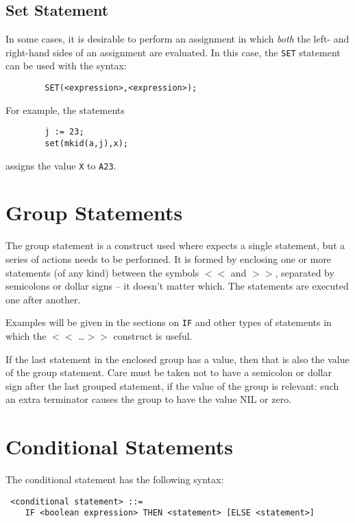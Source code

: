 \subsection{Set Statement}

In some cases, it is desirable to perform an assignment in which {\em both\/}
the left- and right-hand sides of an assignment are
evaluated.  In this case, the {\tt SET} statement can be used
with the syntax:

\begin{verbatim}
        SET(<expression>,<expression>);
\end{verbatim}
For example, the statements
\begin{verbatim}
        j := 23;
        set(mkid(a,j),x);
\end{verbatim}
assigns the value {\tt X} to {\tt A23}.

\section{Group Statements}

The group statement is a construct used where
{\REDUCE} expects a single statement, but a series of actions needs to be
performed.  It is formed by enclosing one or more statements (of any kind)
between the symbols {\tt $<<$} and {\tt $>>$}, separated by semicolons or
dollar signs -- it doesn't matter which.  The statements are executed one
after another.

Examples will be given in the sections on {\tt IF} and other
types of statements in which the {\tt $<<$} \ldots {\tt $>>$} construct is
useful.

If the last statement in the enclosed group has a value, then that is also
the value of the group statement.  Care must be taken not to have a
semicolon or dollar sign after the last grouped statement, if the value of
the group is relevant: such an extra terminator causes the group to have
the value NIL or zero.

\section{Conditional Statements}

The conditional statement has the following
syntax:

\begin{verbatim}
 <conditional statement> ::=
    IF <boolean expression> THEN <statement> [ELSE <statement>]
\end{verbatim}

